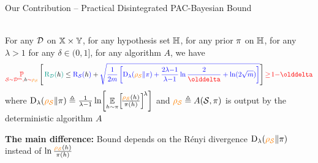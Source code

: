 \documentclass{slides}
\begin{document}
\begin{xframe}{Our Contribution -- {\small Practical Disintegrated PAC-Bayesian Bound}}

\vspace{-0.4cm}
\begin{xblock}{}
\end{xblock}

\begin{redbox}{}
\\
{\scriptsize For any $\D$ on $\X\times\Y$, for any hypothesis set $\H$, for any prior $\P$ on $\H$, for any $\lambda\!>\!1$ for any $\delta\in(0, 1]$, for any algorithm $A$, we have}\\[-0.6cm]
\begin{align*}
    \red{\PP_{\dS\sim\D^{\m},\h\sim \AQ}}\LB\, \green{\Risk_{\D}(\h)} \le \blue{\Risk_{\dS}(\h)} + \blue{\sqrt{\frac{1}{2\m}\LB \Renyi_{\lambda}(\AQ\|\P)+ {\frac{2\lambda{-}1}{\lambda{-}1}}\ln\frac{2}{\delta}
 + \ln(2\sqrt{\m})\RB}} \RB \red{\ge\! 1{-}\delta}
\end{align*}
{\scriptsize where $\Renyi_{\lambda}(\AQ\|\P) \defeq \frac{1}{\lambda{-}1}\ln\!\LB \text{\small${\displaystyle \EE_{\h{\sim}\P}}$}\!\LB\!\frac{ \AQ(\h)}{\P(\h)}\RB^{\!\lambda}\RB$ and $\AQ \defeq A(\dS, \P)$ is output by the deterministic algorithm $A$}
\end{redbox}

\vspace{-0.2cm}

\begin{xblock}{}
{\bf The main difference: } Bound depends on the Rényi divergence $\Renyi_{\lambda}(\AQ\|\P)$ instead of $\ln\frac{\AQ(\h)}{\P(\h)}$

\vspace{-0.3cm}

\vspace{-0.3cm}
\end{xblock}

\end{xframe}
\end{document}
